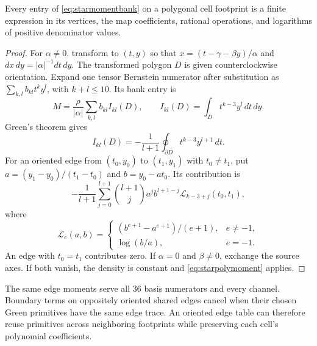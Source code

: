 \begin{theorem}
Every entry of \eqref{eq:starmomentbank} on a polygonal cell footprint is a
finite expression in its vertices, the map coefficients, rational operations,
and logarithms of positive denominator values.
\end{theorem}
\begin{proof}
For $\alpha\ne0$, transform to $(t,y)$ so that
$x=(t-\gamma-\beta y)/\alpha$ and $dx\,dy=|\alpha|^{-1}dt\,dy$.
The transformed polygon $D$ is given counterclockwise orientation. Expand
one tensor Bernstein numerator after substitution as
$\sum_{k,l}b_{kl}t^ky^l$, with $k+l\leq10$. Its bank entry is
\begin{equation}
 M=\frac{\rho}{|\alpha|}\sum_{k,l}b_{kl}I_{kl}(D),\qquad
 I_{kl}(D)=\int_D t^{k-3}y^l\,dt\,dy.
\end{equation}
Green's theorem gives
\begin{equation}
 I_{kl}(D)=-\frac1{l+1}\oint_{\partial D}t^{k-3}y^{l+1}\,dt.
 \label{eq:starprojectiveedge}
\end{equation}
For an oriented edge from $(t_0,y_0)$ to $(t_1,y_1)$ with $t_0\ne t_1$,
put $a=(y_1-y_0)/(t_1-t_0)$ and $b=y_0-at_0$. Its contribution is
\begin{equation}
 -\frac1{l+1}\sum_{j=0}^{l+1}\binom{l+1}{j}
 a^jb^{l+1-j}\mathcal L_{k-3+j}(t_0,t_1),
 \label{eq:staredgeprimitive}
\end{equation}
where
\begin{equation}
 \mathcal L_e(a,b)=
 \begin{cases}
 (b^{e+1}-a^{e+1})/(e+1),&e\ne-1,\\
 \log(b/a),&e=-1.
 \end{cases}
\end{equation}
An edge with $t_0=t_1$ contributes zero. If $\alpha=0$ and $\beta\ne0$,
exchange the source axes. If both vanish, the density is constant and
\eqref{eq:starpolymoment} applies.
\end{proof}

The same edge moments serve all 36 basis numerators and every channel.
Boundary terms on oppositely oriented shared edges cancel when their chosen
Green primitives have the same edge trace.
An oriented edge table can therefore reuse primitives across neighboring
footprints while preserving each cell's polynomial coefficients.


